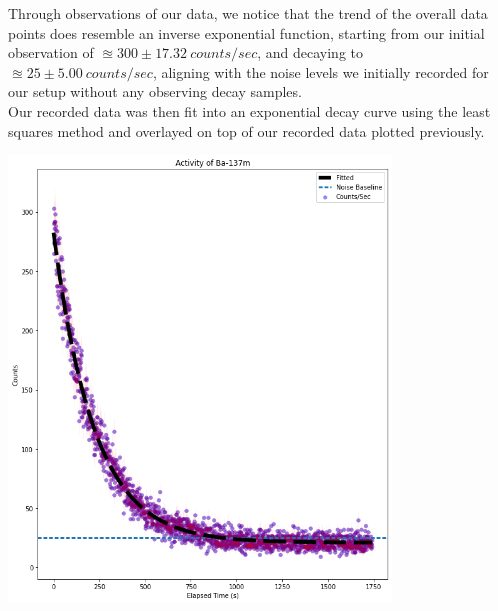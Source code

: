 \documentclass[10pt,letterpaper,onecolumn]{article}
\begin{document}
Through observations of our data, we notice that the trend of the overall data points does resemble an inverse exponential function, starting from our initial observation of $\approxeq 300 \pm 17.32\ counts/sec$, and decaying to $\approxeq 25 \pm 5.00\ counts/sec$, aligning with the noise levels we initially recorded for our setup without any observing decay samples. \\
Our recorded data was then fit into an exponential decay curve using the least squares method and overlayed on top of our recorded data plotted previously.



 \begin{center}
 \includegraphics*[width=4in]{Plot + Fit.png}
 \label{fig:Data and Fit}
 \end{center}
\end{document}
